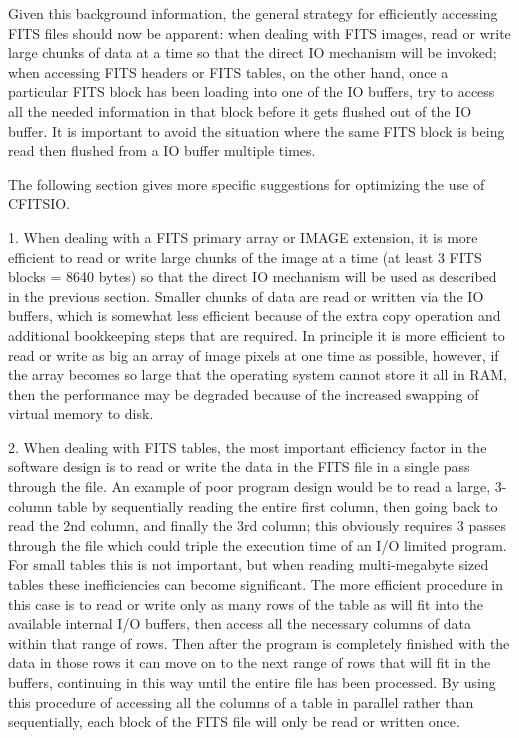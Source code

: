 \documentclass[11pt]{book}
\begin{document}
Given this background information, the general strategy for efficiently
accessing FITS files should now be apparent:  when dealing with FITS
images, read or write large chunks of data at a time so that the direct
IO mechanism will be invoked;  when accessing FITS headers or FITS
tables, on the other hand, once a particular FITS block has been
loading into one of the IO buffers, try to access all the needed
information in that block before it gets flushed out of the IO buffer.
It is important to avoid the situation where the same FITS block is
being read then flushed from a IO buffer multiple times.

The following section gives more specific suggestions for optimizing
the use of CFITSIO.

1.  When dealing with a FITS primary array or IMAGE extension, it is
more efficient to read or write large chunks of the  image at a time
(at least 3 FITS blocks = 8640 bytes) so that the direct IO mechanism
will be used as described in the previous section.  Smaller chunks of
data are read or written via the IO buffers, which is somewhat less
efficient because of the extra copy operation and additional
bookkeeping steps that are required.  In principle it is more efficient
to read or write as big an array of image pixels at one time as
possible, however, if the array becomes so large that the operating
system cannot store it all in RAM, then the performance may be degraded
because of the increased swapping of virtual memory to disk.

2.  When dealing with FITS tables, the most important efficiency factor
in the software design is to read or write the data in the FITS file in
a single pass through the file.  An example of poor program design
would be to read a large, 3-column table by sequentially reading the
entire first column, then going back to read the 2nd column, and
finally the 3rd column; this obviously requires 3 passes through the
file which could triple the execution time of an I/O limited program.
For small tables this is not important, but when reading multi-megabyte
sized tables these inefficiencies can become significant.  The more
efficient procedure in this case is to read or write only as many rows
of the table as will fit into the available internal I/O buffers, then
access all the necessary columns of data within that range of rows.
Then after the program is completely finished with the data in those
rows it can move on to the next range of rows that will fit in the
buffers, continuing in this way until the entire file has been
processed.  By using this procedure of accessing all the columns of a
table in parallel rather than sequentially, each block of the FITS file
will only be read or written once.
\end{document}
